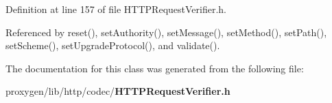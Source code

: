 Definition at line 157 of file H\+T\+T\+P\+Request\+Verifier.\+h.



Referenced by reset(), set\+Authority(), set\+Message(), set\+Method(), set\+Path(), set\+Scheme(), set\+Upgrade\+Protocol(), and validate().



The documentation for this class was generated from the following file\+:\begin{DoxyCompactItemize}
\item 
proxygen/lib/http/codec/{\bf H\+T\+T\+P\+Request\+Verifier.\+h}\end{DoxyCompactItemize}
